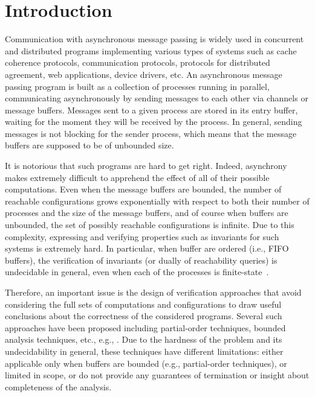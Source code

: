 \section{Introduction}

Communication with asynchronous message passing is widely used in concurrent and distributed programs implementing various types of systems such as cache coherence protocols, communication protocols, protocols for distributed agreement, web applications, device drivers, etc. 
%
An asynchronous message passing program is built as a collection of processes running in parallel, communicating asynchronously by sending messages to each other via channels or message buffers. Messages sent to a given process are stored in its entry buffer, waiting for the moment they will be received by the process. In general, sending messages is not blocking for the sender process, which means that the message buffers are supposed to be of unbounded size. 

It is notorious that such programs are hard to get right. Indeed, asynchrony makes extremely difficult to apprehend the effect of all of their possible computations. %
Even when the message buffers are bounded, the number of reachable configurations grows exponentially with respect to both their number of processes and the size of the message buffers, and of course when buffers are unbounded, the set of possibly reachable configurations is infinite. Due to this complexity, expressing and verifying properties such as invariants for such systems is extremely hard. In particular, when buffer are ordered (i.e., FIFO buffers), the verification of invariants (or dually of reachability queries) is undecidable in general, even when each of the processes is finite-state~\cite{DBLP:journals/jacm/BrandZ83}.

Therefore, an important issue is the design of verification approaches that avoid considering the full sets of computations and configurations to draw useful conclusions about the correctness of the considered programs. Several such approaches have been proposed including partial-order techniques, bounded analysis techniques, etc., e.g., \cite{DBLP:journals/tcs/BasuB16,DBLP:conf/oopsla/Desai0M14,DBLP:conf/tacas/BouajjaniE12,DBLP:conf/tacas/TorreMP08,DBLP:conf/popl/FlanaganG05}. Due to the hardness of the problem and its undecidability in general, these techniques have different limitations: either applicable only when buffers are bounded (e.g., partial-order techniques), or limited in scope, or do not provide any guarantees of termination or insight about completeness of the analysis.

